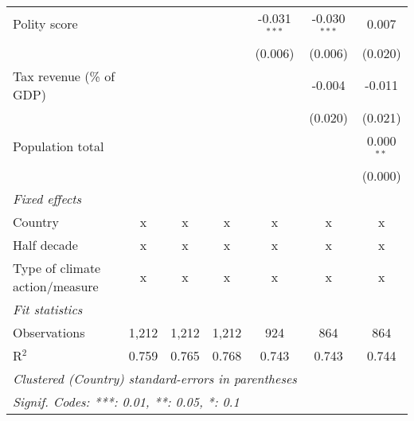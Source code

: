 \begin{tabular}{lcccccc}
   Polity score                                                          &         &               &               & -0.031$^{***}$ & -0.030$^{***}$ & 0.007\\   
                                                                         &         &               &               & (0.006)        & (0.006)        & (0.020)\\   
   Tax revenue (\% of GDP)                                               &         &               &               &                & -0.004         & -0.011\\   
                                                                         &         &               &               &                & (0.020)        & (0.021)\\   
   Population total                                                      &         &               &               &                &                & 0.000$^{**}$\\   
                                                                         &         &               &               &                &                & (0.000)\\   
   \emph{Fixed effects}\\
   Country                                                               & x       & x             & x             & x              & x              & x\\  
   Half decade                                                           & x       & x             & x             & x              & x              & x\\  
   Type of climate action/measure                                        & x       & x             & x             & x              & x              & x\\  
   \midrule \emph{Fit statistics}\\
   Observations                                                          & 1,212   & 1,212         & 1,212         & 924            & 864            & 864\\  
   R$^2$                                                                 & 0.759   & 0.765         & 0.768         & 0.743          & 0.743          & 0.744\\  
   \midrule
   \multicolumn{7}{l}{\emph{Clustered (Country) standard-errors in parentheses}}\\
   \multicolumn{7}{l}{\emph{Signif. Codes: ***: 0.01, **: 0.05, *: 0.1}}\\
\end{tabular}
\par\endgroup


